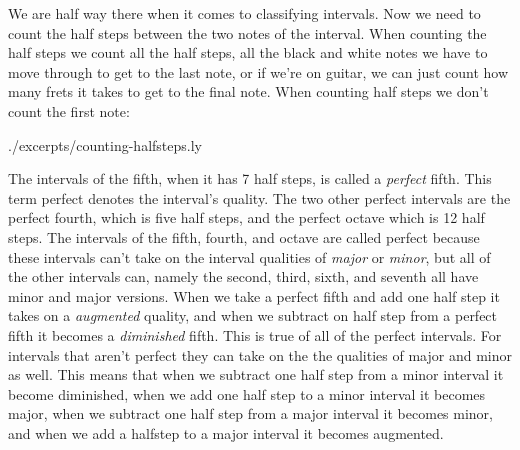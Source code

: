
We are half way there when it comes to classifying intervals. Now we need to count the half steps between the two notes of the interval. When counting the half steps we count all the half steps, all the black and white notes we have to move through to get to the last note, or if we're on guitar, we can just count how many frets it takes to get to the final note. When counting half steps we don't count the first note:

 {./excerpts/counting-halfsteps.ly}

The intervals of the fifth, when it has 7 half steps, is called a \emph{perfect} fifth. This term perfect denotes the interval's quality. The two other perfect intervals are the perfect fourth, which is five half steps, and the perfect octave which is 12 half steps. The intervals of the fifth, fourth, and octave are called perfect because these intervals can't take on the interval qualities of \emph{major} or \emph{minor}, but all of the other intervals can, namely the second, third, sixth, and seventh all have minor and major versions. When we take a perfect fifth and add one half step it takes on a \emph{augmented} quality, and when we subtract on half step from a perfect fifth it becomes a \emph{diminished} fifth. This is true of all of the perfect intervals. For intervals that aren't perfect they can take on the the qualities of major and minor as well. This means that when we subtract one half step from a minor interval it become diminished, when we add one half step to a minor interval it becomes major, when we subtract one half step from a major interval it becomes minor, and when we add a halfstep to a major interval it becomes augmented.

